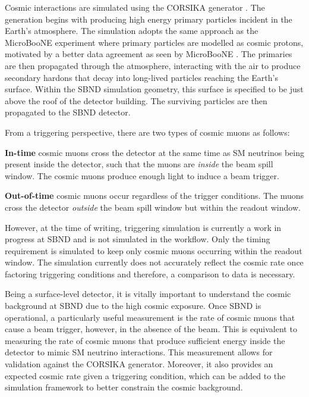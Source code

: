 Cosmic interactions are simulated using the CORSIKA generator \cite{corsika}.
The generation begins with producing high energy primary particles incident in the Earth's atmosphere.
The simulation adopts the same approach as the MicroBooNE experiment where primary particles are modelled as cosmic protons, motivated by a better data agreement as seen by MicroBooNE \cite{corsika_uboone}.
The primaries are then propagated through the atmosphere, interacting with the air to produce secondary hardons that decay into long-lived particles reaching the Earth's surface.
Within the SBND simulation geometry, this surface is specified to be just above the roof of the detector building.
The surviving particles are then propagated to the SBND detector.

From a triggering perspective, there are two types of cosmic muons as follows:
\begin{coloritemize}
        \item\textbf{In-time} cosmic muons cross the detector at the same time as SM neutrinos being present inside the detector, such that the muons are \textit{inside} the beam spill window. The cosmic muons produce enough light to induce a beam trigger.                            
        \item\textbf{Out-of-time} cosmic muons occur regardless of the trigger conditions. The muons cross the detector \textit{outside} the beam spill window but within the readout window.  
\end{coloritemize}
However, at the time of writing, triggering simulation is currently a work in progress at SBND and is not simulated in the workflow. 
Only the timing requirement is simulated to keep only cosmic muons occurring within the readout window.
The simulation currently does not accurately reflect the cosmic rate once factoring triggering conditions and therefore, a comparison to data is necessary. 

Being a surface-level detector, it is vitally important to understand the cosmic background at SBND due to the high cosmic exposure.
Once SBND is operational, a particularly useful measurement is the rate of cosmic muons that cause a beam trigger, however, in the absence of the beam.
This is equivalent to measuring the rate of cosmic muons that produce sufficient energy inside the detector to mimic SM neutrino interactions.
This measurement allows for validation against the CORSIKA generator.
Moreover, it also provides an expected cosmic rate given a triggering condition, which can be added to the simulation framework to better constrain the cosmic background.                

